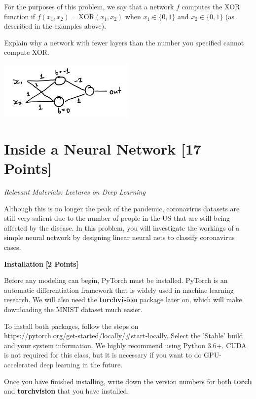 For the purposes of this problem, we say that a network $f$ computes the XOR function if $f(x_1, x_2) = \text{XOR}(x_1, x_2)$ when $x_1 \in \{0, 1\}$ and $x_2 \in \{0, 1\}$ (as described in the examples above).

Explain why a network with fewer layers than the number you specified cannot compute XOR.


\begin{subsolution}


  \includegraphics[width=0.5\textwidth]{images/1e.png}
\end{subsolution}


\newpage
\section{Inside a Neural Network  [17 Points]}

\textit{Relevant Materials: Lectures on Deep Learning}

Although this is no longer the peak of the pandemic, coronavirus datasets are still very salient due to the number of people in the US that are still being affected by the disease. In this problem, you will investigate the workings of a simple neural network by designing linear neural nets to classify coronavirus cases.

\medskip

\problem \textbf{Installation} \textbf{[2 Points]}

Before any modeling can begin, PyTorch must be installed. PyTorch is an automatic differentiation framework that is widely used in machine learning research.  We will also need the \textbf{torchvision} package later on, which will make downloading the MNIST dataset much easier. 

To install both packages, follow the steps on \\
\url{https://pytorch.org/get-started/locally/#start-locally}. Select the 'Stable' build and your system information. We highly recommend using Python 3.6+. CUDA is not required for this class, but it is necessary if you want to do GPU-accelerated deep learning in the future.

Once you have finished installing, write down the version numbers for both \textbf{torch} and \textbf{torchvision} that you have installed.


